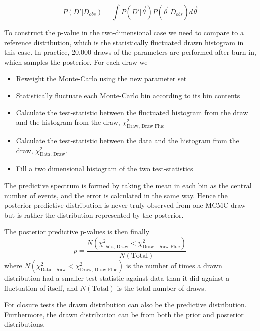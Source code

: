 \begin{equation}
P(D'|D_{obs}) = \int P(D'|\vec{\theta}) P(\vec{\theta}|D_{obs}) d\vec{\theta}
\end{equation}

To construct the p-value in the two-dimensional case we need to compare to a reference distribution, which is the statistically fluctuated drawn histogram in this case. In practice, 20,000 draws of the parameters are performed after burn-in, which samples the posterior. For each draw we
\begin{itemize}
	\item Reweight the Monte-Carlo using the new parameter set
	\item Statistically fluctuate each Monte-Carlo bin according to its bin contents
	\item Calculate the test-statistic between the fluctuated histogram from the draw and the histogram from the draw, $\chi^2_{\text{Draw, Draw Fluc}}$
	\item Calculate the test-statistic between the data and the histogram from the draw, $\chi^2_{\text{Data, Draw}}$.
	\item Fill a two dimensional histogram of the two test-statistics
\end{itemize}
The predictive spectrum is formed by taking the mean in each bin as the central number of events, and the error is calculated in the same way. Hence the posterior predictive distribution is never truly observed from one MCMC draw but is rather the distribution represented by the posterior.

The posterior predictive p-values is then finally
\begin{equation}
p = \frac{N\left(\chi^2_{\text{Data, Draw}} < \chi^2_{\text{Draw, Draw Fluc}}\right)}{N\left(\text{Total}\right)}
\end{equation}
where $N\left(\chi^2_{\text{Data, Draw}} < \chi^2_{\text{Draw, Draw Fluc}}\right)$ is the number of times a drawn distribution had a smaller test-statistic against data than it did against a fluctuation of itself, and $N(\text{Total})$ is the total number of draws.

For closure tests the drawn distribution can also be the predictive distribution. Furthermore, the drawn distribution can be from both the prior and posterior distributions.